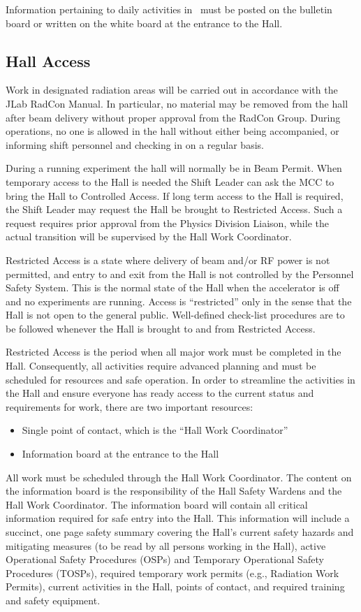 \documentclass[11pt]{article}
\begin{document}
Information pertaining to daily activities in \HALL\ must be posted on the 
bulletin board or written on the white board at the entrance to the Hall.

\subsection{Hall Access}
\indent

Work in designated radiation 
areas will be carried out in accordance
with the JLab RadCon Manual. In particular, no material 
may be removed from the hall after beam delivery
without proper approval from
the RadCon Group.
During operations, no one is allowed in the hall 
without either being accompanied, or informing shift personnel
and checking in on a regular basis. 
 
During a running experiment the hall will normally be in Beam Permit. When 
temporary access to the Hall is needed the Shift Leader can ask the MCC to 
bring the Hall to Controlled Access. If long term access to the Hall is
required, the Shift Leader may request the Hall be brought to Restricted
Access. Such a request requires prior approval from the Physics Division
Liaison, while the actual transition will be supervised by the Hall Work
Coordinator.

Restricted Access is a state where  delivery of beam and/or RF power is not 
permitted, and entry to and exit 
from the Hall is not controlled by the Personnel Safety System. This is the 
normal state of the Hall when the accelerator is off and no experiments are 
running. Access is ``restricted'' only in the sense that the Hall is not open 
to the general public. Well-defined check-list procedures are to
be followed whenever the Hall is brought to and from Restricted Access.

Restricted Access is the period when all major work must be completed in the
Hall. Consequently, all activities require advanced planning and must be 
scheduled for resources and safe operation. In order to streamline the 
activities in the Hall and ensure everyone
has ready access to the current status and requirements for work, there
are two important resources: 
\begin{itemize} 
\item Single point of contact, which is the ``Hall Work Coordinator''
\item Information board at the entrance to the Hall
\end{itemize}
All work must be scheduled through the Hall Work Coordinator. The content 
on the information board is the responsibility of the Hall Safety Wardens 
and the Hall Work Coordinator. The information board will contain all critical 
information required for safe entry into the Hall. This information will
include a succinct, one page safety summary covering the Hall's current
safety hazards and mitigating measures (to be read by all persons working
in the Hall), active Operational Safety Procedures (OSPs) and Temporary
Operational Safety Procedures (TOSPs), required temporary work permits 
(e.g., Radiation Work Permits), current activities in the Hall, points of 
contact, and required training and safety equipment.
\end{document}

